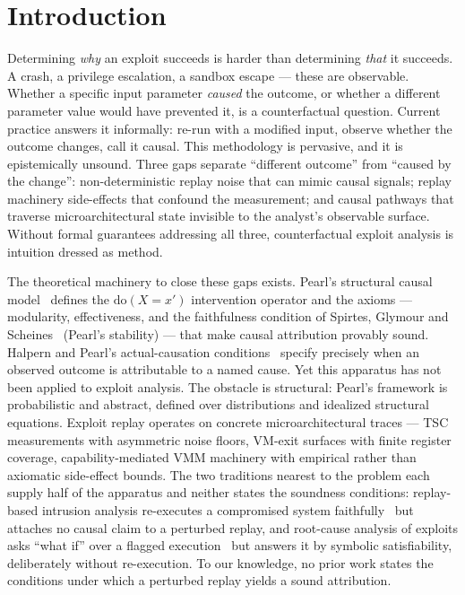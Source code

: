 \documentclass[conference]{IEEEtran}
\newcommand{\dox}[1]{\text{do}(X{=}#1)}
\begin{document}
\section{Introduction}\label{sec:intro}

Determining \emph{why} an exploit succeeds is harder than determining
\emph{that} it succeeds. A crash, a privilege escalation, a sandbox
escape --- these are observable. Whether a specific input parameter
\emph{caused} the outcome, or whether a different parameter value
would have prevented it, is a counterfactual question. Current
practice answers it informally: re-run with a modified input, observe
whether the outcome changes, call it causal. This methodology is
pervasive, and it is epistemically unsound. Three gaps separate
``different outcome'' from ``caused by the change'':
non-deterministic replay noise that can mimic causal signals; replay
machinery side-effects that confound the measurement; and causal
pathways that traverse microarchitectural state invisible to the
analyst's observable surface. Without formal guarantees addressing
all three, counterfactual exploit analysis is intuition dressed as
method.

The theoretical machinery to close these gaps exists. Pearl's
structural causal model~\cite{pearl2009causality} defines the
$\dox{x'}$ intervention operator and the axioms --- modularity,
effectiveness, and the faithfulness condition of Spirtes, Glymour and
Scheines~\cite{spirtes2000causation} (Pearl's stability) --- that make
causal attribution provably sound. Halpern and Pearl's actual-causation
conditions~\cite{halpern2005causes} specify precisely when an
observed outcome is attributable to a named cause. Yet this apparatus
has not been applied to exploit analysis. The obstacle is structural:
Pearl's framework is probabilistic and abstract, defined over
distributions and idealized structural equations. Exploit replay
operates on concrete microarchitectural traces --- TSC measurements
with asymmetric noise floors, VM-exit surfaces with finite register
coverage, capability-mediated VMM machinery with empirical rather
than axiomatic side-effect bounds. The two traditions nearest to
the problem each supply half of the apparatus and neither states
the soundness conditions: replay-based intrusion analysis
re-executes a compromised system faithfully~\cite{dunlap2002revirt}
but attaches no causal claim to a perturbed replay, and root-cause
analysis of exploits asks ``what if'' over a flagged
execution~\cite{yagemann2021arcus} but answers it by symbolic
satisfiability, deliberately without re-execution. To our knowledge,
no prior work states the conditions under which a perturbed replay
yields a sound attribution.
\end{document}
